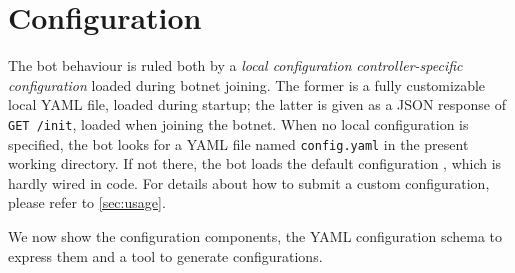 \section{Configuration}
\label{sec:configuration}

The bot behaviour is ruled both by a \textit{local configuration} \textit{controller-specific configuration} loaded during botnet joining. The former is a fully customizable local YAML file, loaded during startup; the latter is given as a JSON response of \texttt{GET /init}, loaded when joining the botnet.
When no local configuration is specified, the bot looks for a YAML file named \texttt{config.yaml} in the present working directory. If not there, the bot loads the default configuration , which is hardly wired in code. For details about how to submit a custom configuration, please refer to \ref{sec:usage}.

We now show the configuration components, the YAML configuration schema to express them and a tool to generate configurations.

